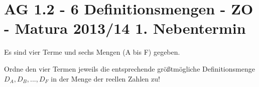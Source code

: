 \section{AG 1.2 - 6 Definitionsmengen - ZO - Matura 2013/14 1. Nebentermin}

\begin{beispiel}[AG 1.2]{1} %
				Es sind vier Terme und sechs Mengen (A bis F) gegeben.
				
				Ordne den vier Termen jeweils die entsprechende größtmögliche Definitionsmenge $D_A, D_B, ... , D_F$ in der Menge der reellen Zahlen zu!\leer
				
				\zuordnen{
								R1={$\ln(x+1)$},				%
								R2={$\sqrt{1-x}$},				%
								R3={$\frac{2x}{x\cdot(x+1)^2}$},				%
								R4={$\frac{2x}{x^2+1}$},				%
								A={$D_A=\mathbb{R}$}, 				%
								B={$D_B=(1;\infty)$}, 				%
								C={$D_C=(-1;\infty)$}, 				%
								D={$D_D=\mathbb{R}\backslash\left\{-1;0\right\}$}, 				%
								E={$D_E=(-\infty;1)$}, 				%
								F={$D_F=(-\infty;1]$}, 				%
								A1={C},				%
								A2={F},				%
								A3={D},				%
								A4={A},				%
								}
\end{beispiel}